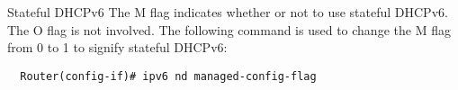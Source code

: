 \documentclass[../EngineeringJournal_CDavis.tex]{subfiles}
\begin{document}
\hspace{0.2cm}
\begin{tcolorbox}[width=6.3in]
Stateful DHCPv6
\scriptsize 
The M flag indicates whether or not to use stateful DHCPv6. 
The O flag is not involved. The following command is used to change 
the M flag from 0 to 1 to signify stateful DHCPv6:
  \begin{verbatim}
  Router(config-if)# ipv6 nd managed-config-flag 
  \end{verbatim}
\end{tcolorbox}
\hspace{0.2cm}
\normalsize  

\end{document}
